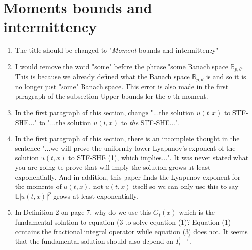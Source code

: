 \documentclass[a4paper,11pt]{article}
\numberwithin{equation}{section}
\numberwithin{equation}{section}
\theoremstyle{plain}
\theoremstyle{definition}
\begin{document}
\section{Moments bounds and intermittency}
\begin{enumerate}
	\item
The title should be changed to "\textit{Moment} bounds and intermittency" 
	
	\item
I would remove the word "some" before the phrase "some Banach space $\mathbb{B}_{p,\theta}$. This is because we already defined what the Banach space $\mathbb{B}_{p,\theta}$ is and so it is no longer just "some" Banach space. This error is also made in the first paragraph of the subsection Upper bounds for the $p$-th moment. 
	
	\item
In the first paragraph of this section, change "...the solution $u(t,x)$ to STF-SHE..." to "...the solution $u(t,x)$ to \textit{the} STF-SHE...".

	\item 
In the first paragraph of this section, there is an incomplete thought in the sentence "...we will prove the uniformly lower Lyapunov's exponent of the solution $u(t,x)$ to STF-SHE (1), which implies...". It was never stated what you are going to prove that will imply the solution grows at least exponentially. And in addition, this paper finds the Lyapunov exponent for the moments of $u(t,x)$, not $u(t,x)$ itself so we can only use this to say $\mathbb{E}|u(t,x)|^p$ grows at least exponentially. 

	\item 
In Definition 2 on page 7, why do we use this $G_t(x)$ which is the fundamental solution to equation (3 to solve equation (1)? Equation (1) contains the fractional integral operator while equation (3) does not. It seems that the fundamental solution should also depend on $I^{1-\beta}_t$. 
\end{enumerate}
\end{document}
